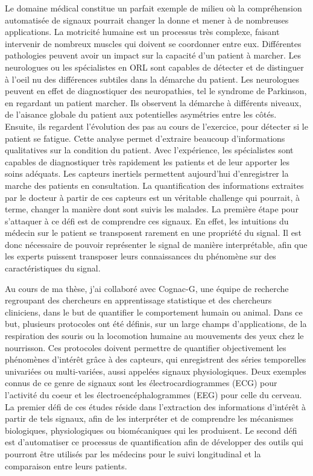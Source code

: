 \documentclass[../thesis.tex]{subfiles}
\begin{document}
	Le domaine médical constitue un parfait exemple de milieu où la compréhension automatisée
	de signaux pourrait changer la donne et mener à de nombreuses applications. La motricité
	humaine est un processus très complexe, faisant intervenir de nombreux muscles qui doivent
	se coordonner entre eux. Différentes pathologies peuvent avoir un impact sur la capacité
	d'un patient à marcher. Les neurologues ou les spécialistes en ORL sont capables de détecter
	et de distinguer à l'oeil nu des différences subtiles dans la démarche du patient. Les neurologues
	peuvent en effet de diagnostiquer des neuropathies, tel le syndrome de Parkinson, en
	regardant un patient marcher. Ils observent la démarche à différents niveaux, de l'aisance
	globale du patient aux potentielles asymétries entre les côtés. Ensuite, ils regardent
	l'évolution des pas au cours de l'exercice, pour détecter si le patient se fatigue. Cette
	analyse permet d'extraire beaucoup d'informations qualitatives sur la condition du patient.
	Avec l'expérience, les spécialistes sont capables de diagnostiquer très rapidement
	les patients et de leur apporter les soins adéquats. Les capteurs inertiels permettent
	aujourd'hui d'enregistrer la marche des patients en consultation. La quantification des
	informations extraites par le docteur à partir de ces capteurs est un véritable challenge
	qui pourrait, à terme, changer la manière dont sont suivis les malades. La première étape
	pour s'attaquer à ce défi est de comprendre ces signaux. En effet, les intuitions
	du médecin sur le patient se transposent rarement en une propriété du signal. Il est donc
	nécessaire de pouvoir représenter le signal de manière interprétable, afin que les
	experts puissent transposer leurs connaissances du phénomène sur des caractéristiques
	du signal.


	Au cours de ma thèse, j'ai collaboré avec Cognac-G, une équipe de recherche regroupant
	des chercheurs en apprentissage statistique et des chercheurs cliniciens, dans le but
	de quantifier le comportement humain ou animal. Dans ce but, plusieurs protocoles ont
	été définis, sur un large champs d'applications, de la respiration des souris ou la
	locomotion humaine au mouvements des yeux chez le nourrisson. Ces protocoles doivent
	permettre de quantifier objectivement les phénomènes d'intérêt grâce à des capteurs,
	qui enregistrent des séries temporelles univariées ou multi-variées, aussi appelées
	signaux physiologiques. Deux exemples connus de ce genre de signaux sont les
	électrocardiogrammes (ECG) pour l'activité du coeur et les électroencéphalogrammes
	(EEG) pour celle du cerveau. La premier défi de ces études réside dans l'extraction
	des informations d'intérêt à partir de tels signaux, afin de les interpréter et de
	comprendre les mécanismes biologiques, physiologiques ou biomécaniques qui les
	produisent. Le second défi est d'automatiser ce processus de quantification afin
	de développer des outils qui pourront être utilisés par les médecins pour le suivi
	longitudinal et la comparaison entre leurs patients.
\end{document}
